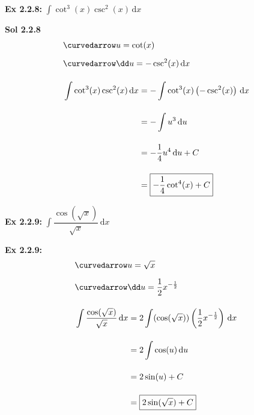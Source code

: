 \begin{tcolorbox}[example]
    \textbf{Ex 2.2.8: } $\int \cot^3 (x)\csc^2 (x) \,\mathrm{d}x$ 
\end{tcolorbox}
\begin{tcolorbox}[solution]
    \textbf{Sol 2.2.8 } \begin{align*}
        & \curvedarrow u = \cot (x) \\[5.5pt]
        & \curvedarrow \dd u = -\csc^2 (x) \,\mathrm{d}x \\[11pt]
        & \int \cot^3 (x)\csc^2 (x) \,\mathrm{d}x \begin{aligned}[t]
            & = -\int \cot^3 (x)\left(-\csc^2 (x)\right) \,\mathrm{d}x \\[11pt]
            & = -\int u^3 \,\mathrm{d}u \\[11pt]
            & = -\dfrac{1}{4}u^4 \,\mathrm{d}u + C \\[11pt]
            & = \boxed{-\dfrac{1}{4}\cot^4 (x) + C}
        \end{aligned}
    \end{align*}
\end{tcolorbox} \vspace{11pt}

\begin{tcolorbox}[example]
    \textbf{Ex 2.2.9: } $\int \dfrac{\cos (\sqrt{x})}{\sqrt{x}} \,\mathrm{d}x$
\end{tcolorbox}
\begin{tcolorbox}[solution]
    \textbf{Ex 2.2.9: } \begin{align*}
        & \curvedarrow u = \sqrt{x} \\[5.5pt]
        & \curvedarrow \dd u = \dfrac{1}{2}x^{-\frac{1}{2}} \\[11pt]
        & \int \dfrac{\cos (\sqrt{x})}{\sqrt{x}} \,\mathrm{d}x \begin{aligned}[t]
            & = 2\int (\cos (\sqrt{x}))\left(\dfrac{1}{2}x^{-\frac{1}{2}}\right) \,\mathrm{d}x \\[11pt]
            & = 2\int \cos (u) \,\mathrm{d}u \\[11pt]
            & = 2\sin (u) + C \\[11pt]
            & = \boxed{2\sin (\sqrt{x}) + C}
        \end{aligned}
    \end{align*}
\end{tcolorbox} \vspace{11pt}

